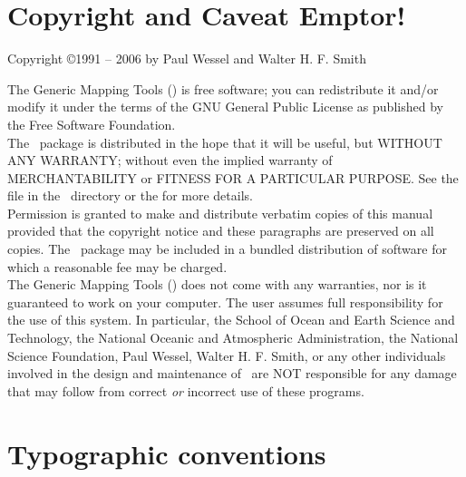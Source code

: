 
\chapter*{Copyright and Caveat Emptor!}

\begin{center}
Copyright \copyright 1991 -- 2006 by Paul Wessel and Walter H. F. Smith
\end{center}

\vspace{\baselineskip}

The Generic Mapping Tools (\GMT) is free software; you can redistribute
it and/or modify it under the terms of the GNU General Public License
as published by the Free Software Foundation. \\

The \GMT\ package is distributed in the hope that it will be useful, but
WITHOUT ANY WARRANTY; without even the implied warranty of
MERCHANTABILITY or FITNESS FOR A PARTICULAR PURPOSE.  See the
file  in the \GMT\ directory or the
for more details. \\

Permission is granted to make and distribute verbatim copies of this
manual provided that the copyright notice and these paragraphs are
preserved on all copies.  The \GMT\ package may be included in a bundled
distribution of software for which a reasonable fee may be charged. \\

The Generic Mapping Tools (\GMT) does not come with any warranties,
nor is it guaranteed to work on your computer.  The user assumes full
responsibility for the use of this system. In particular, the School of
Ocean and Earth Science and Technology, the National Oceanic and
Atmospheric Administration, the National Science Foundation,
Paul Wessel, Walter H. F. Smith, or any other individuals involved in
the design and maintenance of \GMT\ are NOT responsible for any damage
that may follow from correct \emph{or} incorrect use of these programs.


\chapter*{Typographic conventions}

